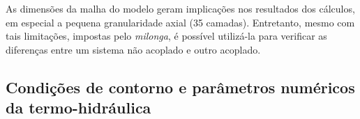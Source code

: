 As dimensões da malha do modelo geram implicações nos resultados dos cálculos, em
especial a pequena granularidade axial (35 camadas). Entretanto, mesmo com tais
limitações, impostas pelo \textit{milonga}, é possível utilizá-la para verificar
as diferenças entre um sistema não acoplado e outro acoplado.


\subsection{Condições de contorno e parâmetros numéricos da termo-hidráulica}
\label{subsec:ccth}

